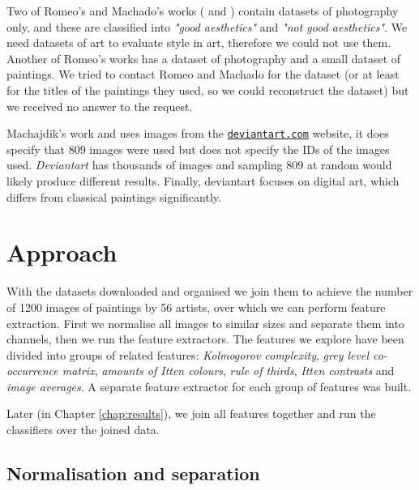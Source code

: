 \documentclass[11pt,a4paper,twoside,openright]{report}
\begin{document}
Two of Romeo's and Machado's works (\cite{jma12clas} and \cite{cmrc13fs})
contain datasets of photography only, and these are classified into \emph{"good
aesthetics"} and \emph{"not good aesthetics"}.  We need datasets of art to
evaluate style in art, therefore we could not use them.  Another of Romeo's
works \cite{rmc12ajs} has a dataset of photography and a small dataset of
paintings.  We tried to contact Romeo and Machado for the dataset (or at least
for the titles of the paintings they used, so we could reconstruct the dataset)
but we received no answer to the request.

Machajdik's work \cite{mach10clas} and \cite{mach10ua} uses images from the
\href{http://deviantart.com}{\texttt{deviantart.com}} website, it does specify
that 809 images were used but does not specify the IDs of the images used.
\emph{Deviantart} has thousands of images and sampling 809 at random would
likely produce different results.  Finally, deviantart focuses on digital art,
which differs from classical paintings significantly.


\chapter{Approach}  %
\label{chap:approach}

With the datasets downloaded and organised we join them to achieve the number
of 1200 images of paintings by 56 artists, over which we can perform feature
extraction.  First we normalise all images to similar sizes and separate them
into channels, then we run the feature extractors.  The features we explore
have been divided into groups of related features: \emph{Kolmogorov
complexity}, \emph{grey level co-occurrence matrix}, \emph{amounts of Itten
colours}, \emph{rule of thirds}, \emph{Itten contrasts} and \emph{image
averages}.  A separate feature extractor for each group of features was built.

Later (in Chapter \ref{chap:results}), we join all features together and run
the classifiers over the joined data.

\section{Normalisation and separation}
\end{document}
